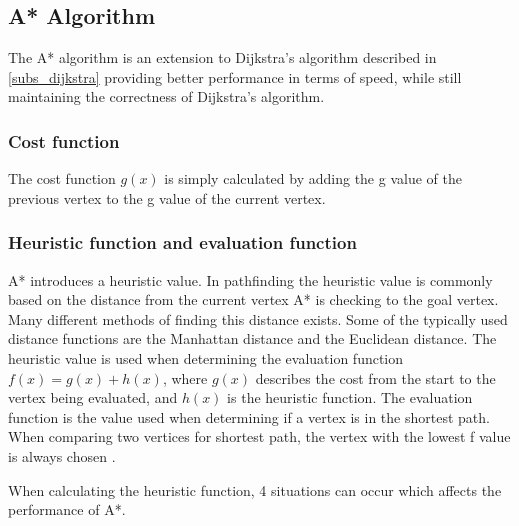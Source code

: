 

  \subsection{A* Algorithm}\label{subs_astar}


  The A* algorithm is an extension to Dijkstra's algorithm described in \cref{subs_dijkstra} providing better performance in terms of speed, while still maintaining the correctness of Dijkstra's algorithm.

  \subsubsection{Cost function}
  The cost function $g(x)$ is simply calculated by adding the g value of the previous vertex to the g value of the current vertex.

  \subsubsection{Heuristic function and evaluation function}
  A* introduces a heuristic value. In pathfinding the heuristic value is commonly based on the distance from the current vertex A* is checking to the goal vertex. Many different methods of finding this distance exists. Some of the typically used distance functions are the Manhattan distance and the Euclidean distance. The heuristic value is used when determining the evaluation function $f(x) = g(x) + h(x)$, where $g(x)$ describes the cost from the start to the vertex being evaluated, and $h(x)$ is the heuristic function. The evaluation function is the value used when determining if a vertex is in the shortest path. When comparing two vertices for shortest path, the vertex with the lowest f value is always chosen \cite{Patel2013}.

  When calculating the heuristic function, 4 situations can occur which affects the performance of A*.

